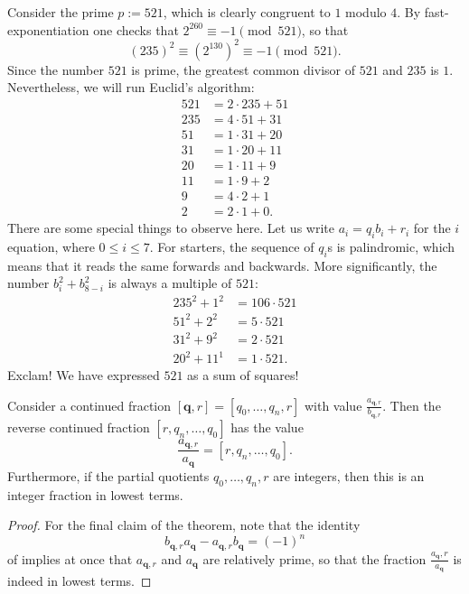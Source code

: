 \begin{noteblock}
Consider the prime $p:= 521$, which is clearly congruent to $1$ modulo $4$. By fast-exponentiation one checks that $2^{260}\equiv -1\pmod{521}$, so that
\begin{equation*}
  (235)^2\equiv (2^{130})^2 \equiv -1\pmod{521}.
\end{equation*}
Since the number $521$ is prime, the greatest common divisor of $521$ and $235$ is $1$. Nevertheless, we will run Euclid's algorithm:
\begin{align*}
  521 & = 2\cdot 235 + 51 \\
  235 & = 4\cdot 51 + 31 \\
  51 & = 1\cdot 31 + 20 \\
  31 & = 1\cdot 20 + 11 \\
  20 & = 1\cdot 11 + 9 \\
  11 & = 1\cdot 9 + 2 \\
  9 & = 4\cdot 2 + 1 \\
  2 & = 2\cdot 1 + 0.
\end{align*}
There are some special things to observe here. Let us write $a_i=q_ib_i+r_i$ for the $i$\supth{} equation, where $0\leq i\leq 7$. For starters, the sequence of $q_i$s is palindromic, which means that it reads the same forwards and backwards. More significantly, the number $b_i^2+b_{8-i}^2$ is always a multiple of $521$:
\begin{align*}
  235^2 + 1^2 & = 106 \cdot 521 \\
  51^2 + 2^2 & = 5 \cdot 521 \\
  31^2 + 9^2 & = 2 \cdot 521 \\
  20^2 + 11^1 & = 1 \cdot 521.
\end{align*}
Exclam! We have expressed $521$ as a sum of squares!

\begin{theorem}
  Consider a continued fraction $[\symbf{q},r]=[q_0,\ldots,q_n,r]$ with value $\frac{a_{\symbf{q},r}}{b_{\symbf{q},r}}$.
  Then the reverse continued fraction $[r,q_n,\ldots,q_0]$ has the value
  \begin{equation*}
    \frac{a_{\symbf{q},r}}{a_{\symbf{q}}}=[r,q_n,\ldots,q_0].
  \end{equation*}
  Furthermore, if the partial quotients $q_0,\ldots,q_n,r$ are integers, then this is an integer fraction in lowest terms.
\end{theorem}

\begin{proof}
  For the final claim of the theorem, note that the identity
  \begin{equation*}
    b_{\symbf{q},r}a_{\symbf{q}}-a_{\symbf{q},r}b_{\symbf{q}}=(-1)^n
  \end{equation*}
  of  implies at once that $a_{\symbf{q},r}$ and $a_{\symbf{q}}$ are relatively prime, so that the fraction $\frac{a_{\symbf{q}},r}{a_{\symbf{q}}}$ is indeed in lowest terms.
\end{proof}


\end{noteblock}
